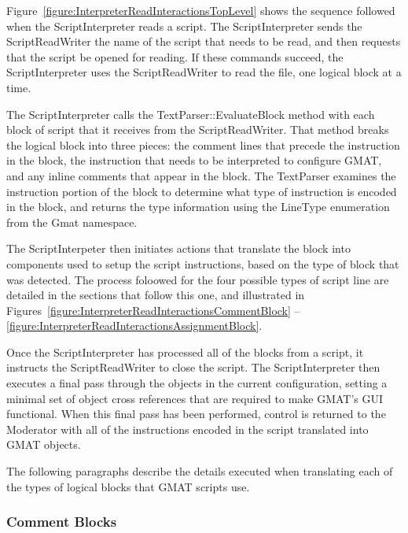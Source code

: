 Figure~\ref{figure:InterpreterReadInteractionsTopLevel} shows the sequence followed when the
ScriptInterpreter reads a script.  The ScriptInterpreter sends the ScriptReadWriter the name
of the script that needs to be read, and then requests that the script be opened for reading.
If these commands succeed, the ScriptInterpreter uses the ScriptReadWriter to read the file, one
logical block at a time.

The ScriptInterpreter calls the TextParser::EvaluateBlock method with each block of script that it
receives from the ScriptReadWriter.  That method breaks the logical block into three pieces: the
comment lines that precede the instruction in the block, the instruction that needs to be
interpreted to configure GMAT, and any inline comments that appear in the block.  The TextParser
examines the instruction portion of the block to determine what type of instruction is encoded in
the block, and returns the type information using the LineType enumeration from the Gmat namespace.

The ScriptInterpeter then initiates actions that translate the block into components used to
setup the script instructions, based on the type of block that was detected.  The process foloowed
for the four possible types of script line are detailed in the sections that follow this one, and
illustrated in Figures~\ref{figure:InterpreterReadInteractionsCommentBlock} --
\ref{figure:InterpreterReadInteractionsAssignmentBlock}.

Once the ScriptInterpreter has processed all of the blocks from a script, it instructs the
ScriptReadWriter to close the script.  The ScriptInterpreter then executes a final pass through the
objects in the current configuration, setting a minimal set of object cross references that are
required to make GMAT's GUI functional.  When this final pass has been performed, control is
returned to the Moderator with all of the instructions encoded in the script translated into GMAT
objects.

The following paragraphs describe the details executed when translating each of the types of
logical blocks that GMAT scripts use.

\subsubsection{Comment Blocks}

